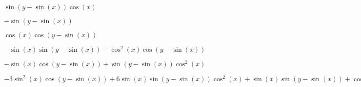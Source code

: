 \documentclass[11pt]{article}
\begin{document}
    $\sin{\left(y - \sin{\left(x \right)} \right)} \cos{\left(x \right)}$

    
    $- \sin{\left(y - \sin{\left(x \right)} \right)}$

    
    $\cos{\left(x \right)} \cos{\left(y - \sin{\left(x \right)} \right)}$

    
    $- \sin{\left(x \right)} \sin{\left(y - \sin{\left(x \right)} \right)} - \cos^{2}{\left(x \right)} \cos{\left(y - \sin{\left(x \right)} \right)}$

    
    $- \sin{\left(x \right)} \cos{\left(y - \sin{\left(x \right)} \right)} + \sin{\left(y - \sin{\left(x \right)} \right)} \cos^{2}{\left(x \right)}$

    
    $- 3 \sin^{2}{\left(x \right)} \cos{\left(y - \sin{\left(x \right)} \right)} + 6 \sin{\left(x \right)} \sin{\left(y - \sin{\left(x \right)} \right)} \cos^{2}{\left(x \right)} + \sin{\left(x \right)} \sin{\left(y - \sin{\left(x \right)} \right)} + \cos^{4}{\left(x \right)} \cos{\left(y - \sin{\left(x \right)} \right)} + 4 \cos^{2}{\left(x \right)} \cos{\left(y - \sin{\left(x \right)} \right)}$
\end{document}

